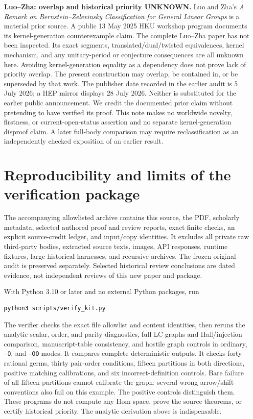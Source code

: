\documentclass[11pt]{article}
\begin{document}
\medskip
\noindent\textbf{Luo--Zha: overlap and historical priority UNKNOWN.}
Luo and Zha's \emph{A Remark on Bernstein--Zelevinsky Classification for General Linear Groups} \cite{LZ} is a material prior source. A public 13 May 2025 HKU workshop program \cite[p.4]{HKU} documents its kernel-generation counterexample claim. The complete Luo--Zha paper has not been inspected. Its exact segments, translated/dual/twisted equivalences, kernel mechanism, and any unitary-period or conjecture consequences are all unknown here. Avoiding kernel-generation equality as a dependency does not prove lack of priority overlap. The present construction may overlap, be contained in, or be superseded by that work. The publisher date recorded in the earlier audit is 5 July 2026; a HEP mirror displays 28 July 2026. Neither is substituted for the earlier public announcement. We credit the documented prior claim without pretending to have verified its proof. This note makes no worldwide novelty, firstness, or current-open-status assertion and no separate kernel-generation disproof claim. A later full-body comparison may require reclassification as an independently checked exposition of an earlier result.

\section{Reproducibility and limits of the verification package}
The accompanying allowlisted archive contains this source, the PDF, scholarly metadata, selected authored proof and review reports, exact finite checks, an explicit source-credit ledger, and input/copy identities. It excludes all private raw third-party bodies, extracted source texts, images, API responses, runtime fixtures, large historical harnesses, and recursive archives. The frozen original audit is preserved separately. Selected historical review conclusions are dated evidence, not independent reviews of this new paper and package.

With Python 3.10 or later and no external Python packages, run
\begin{verbatim}
python3 scripts/verify_kit.py
\end{verbatim}
The verifier checks the exact file allowlist and content identities, then reruns the analytic scalar, order, and parity diagnostics, full LC graphs and Hall/injection comparison, manuscript-table consistency, and hostile graph controls in ordinary, \texttt{-O}, and \texttt{-OO} modes. It compares complete deterministic outputs. It checks forty rational germs, thirty pair-order conditions, fifteen partitions in both directions, positive matching calibrations, and six incorrect-definition controls. Bare failure of all fifteen partitions cannot calibrate the graph: several wrong arrow/shift conventions also fail on this example. The positive controls distinguish them. These programs do not compute any Hom space, prove the source theorems, or certify historical priority. The analytic derivation above is indispensable.
\end{document}
